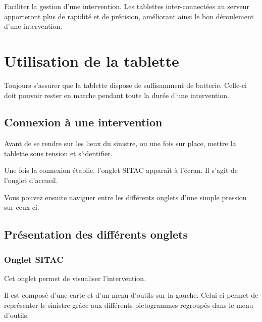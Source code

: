 \documentclass{article}
\begin{document}
\leftskip=0pt
{\color{color01} Faciliter la gestion d'une intervention. Les tablettes inter-connectées 
au serveur apporteront plus de rapidité et de précision, améliorant ainsi le 
bon déroulement d'une intervention.\label{h.gzqdoesw1axu}}

\vspace{24pt}
\section*{{\LARGE {\color{color01} \textbf{Utilisation de la tablette}}}}

{\color{color01} Toujours s'assurer que la tablette dispose de suffisamment de 
batterie. Celle-ci doit pouvoir rester en marche pendant toute la durée d'une 
intervention.\label{h.6wfxkflj8t91}}

\vspace{18pt}
\subsection*{{\large {\color{color01} \textbf{Connexion à une intervention}}}}

{\color{color01} Avant de se rendre sur les lieux du sinistre, ou une fois sur 
place, mettre la tablette sous tension et s'identifier. }

{\color{color01} Une fois la connexion établie, l'onglet SITAC apparaît à l'écran. 
Il s'agit de l'onglet d'accueil.}

{\color{color01} Vous pouvez ensuite naviguer entre les différents onglets d'une 
simple pression sur ceux-ci.\label{h.z14vezbfw66e}}

\vspace{31pt}
\subsection*{{\large {\color{color01} \textbf{Présentation des différents onglets\label{h.4nf2fd2fzqlp}}}}}

\vspace{14pt}
\subsubsection*{{\color{color02} \textbf{Onglet SITAC}}}

{\color{color01} Cet onglet permet de visualiser l'intervention. }

{\color{color01} Il est composé d'une carte et d'un menu d'outils sur la gauche. 
Celui-ci permet de représenter le sinistre grâce aux différents pictogrammes 
regroupés dans le menu d'outils.}
\end{document}
